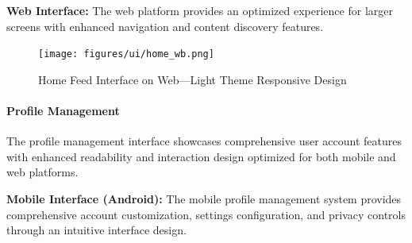 \clearpage
\textbf{Web Interface:}
The web platform provides an optimized experience for larger screens with enhanced navigation and content discovery features.

\begin{figure}[!htbp]
    \centering
    \texttt{[image: figures/ui/home\_wb.png]}
    \caption{Home Feed Interface on Web---Light Theme Responsive Design}\label{fig:web_home}
\end{figure}

\paragraph{Profile Management}
The profile management interface showcases comprehensive user account features with enhanced readability and interaction design optimized for both mobile and web platforms.

\textbf{Mobile Interface (Android):}
The mobile profile management system provides comprehensive account customization, settings configuration, and privacy controls through an intuitive interface design.

